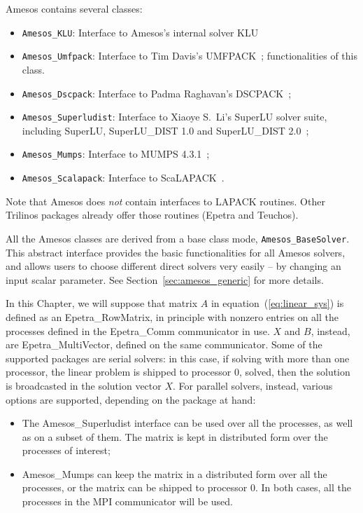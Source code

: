 Amesos contains several classes: 
\begin{itemize}
\item \verb!Amesos_KLU!: Interface to Amesos's internal solver KLU
\item \verb!Amesos_Umfpack!: Interface to Tim Davis's
  UMFPACK~\cite{umfpack-home-page};
  functionalities of this class.
\item \verb!Amesos_Dscpack!: Interface to Padma Raghavan's
  DSCPACK~\cite{dscpack-home-page};
\item \verb!Amesos_Superludist!: Interface to Xiaoye S.~Li's SuperLU
  solver suite, including SuperLU, SuperLU\_DIST 1.0 and SuperLU\_DIST
  2.0~\cite{superlu-home-page};
\item \verb!Amesos_Mumps!: Interface to MUMPS 4.3.1~\cite{mumps-home-page};
\item \verb!Amesos_Scalapack!: Interface to ScaLAPACK~\cite{scalapack}.
\end{itemize}
% 

Note that Amesos does {\sl not} contain interfaces to LAPACK routines.
Other Trilinos packages already offer those routines (Epetra and
Teuchos).

All the Amesos classes are derived from a base class mode,
\verb!Amesos_BaseSolver!. This abstract interface provides the basic
functionalities for all Amesos solvers, and allows users to choose
different direct solvers very easily -- by changing an input scalar
parameter. See Section~\ref{sec:amesos_generic} for more details.

In this Chapter, we will suppose that matrix $A$ in
equation~(\ref{eq:linear_sys}) is defined as an Epetra\_RowMatrix, in
principle with nonzero entries on all the processes defined in the
Epetra\_Comm communicator in use. $X$ and $B$, instead, are
Epetra\_MultiVector, defined on the same communicator.  Some of the
supported packages are serial solvers: in this case, if solving with
more than one processor, the linear problem is shipped to processor 0,
solved, then the solution is broadcasted in the solution vector $X$. For
parallel solvers, instead, various options are supported, depending on
the package at hand:
\begin{itemize}
\item The Amesos\_Superludist interface can be used over all the
  processes, as well as on a subset of them. The matrix is kept in
  distributed form over the processes of interest;
\item Amesos\_Mumps can keep the matrix in a distributed form over all
  the processes, or the matrix can be shipped to processor 0. In both
  cases, all the processes in the MPI communicator will be used.
\end{itemize}

